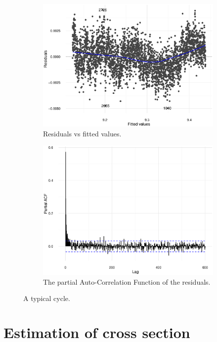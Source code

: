 \documentclass[reprint]{revtex4-1}
\newcommand{\scl}{.39}
\begin{document}
\begin{figure}
\centering
\begin{subfigure}{.5\textwidth}
\includegraphics[scale=\scl]{img/Run969_Res_VS_Fit.eps}
\caption{Residuals vs fitted values.}
\end{subfigure}
\begin{subfigure}{.5\textwidth}
\includegraphics[scale=\scl]{img/Run969_residual_PACF.eps}
\caption{The partial Auto-Correlation Function of the residuals.}
\end{subfigure}
\caption{A typical cycle.\label{fig:Run969}}
\end{figure}

\section{Estimation of cross section}
\end{document}
